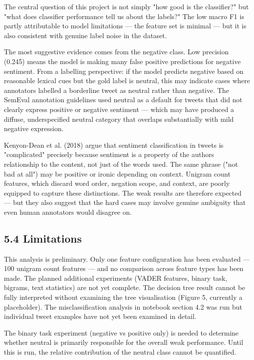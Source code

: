 \documentclass[
  12pt,
]{article}
\begin{document}
The central question of this project is not simply "how good is the
classifier?" but "what does classifier performance tell us about the
labels?" The low macro F1 is partly attributable to model limitations
--- the feature set is minimal --- but it is also consistent with
genuine label noise in the dataset.

The most suggestive evidence comes from the negative class. Low
precision (0.245) means the model is making many false positive
predictions for negative sentiment. From a labelling perspective: if the
model predicts negative based on reasonable lexical cues but the gold
label is neutral, this may indicate cases where annotators labelled a
borderline tweet as neutral rather than negative. The SemEval annotation
guidelines used neutral as a default for tweets that did not clearly
express positive or negative sentiment --- which may have produced a
diffuse, underspecified neutral category that overlaps substantially
with mild negative expression.

Kenyon-Dean et al. (2018) argue that sentiment classification in tweets
is "complicated" precisely because sentiment is a property of the
author\textquotesingle s relationship to the content, not just of the
words used. The same phrase ("not bad at all") may be positive or ironic
depending on context. Unigram count features, which discard word order,
negation scope, and context, are poorly equipped to capture these
distinctions. The weak results are therefore expected --- but they also
suggest that the hard cases may involve genuine ambiguity that even
human annotators would disagree on.

\subsection{5.4 Limitations}\label{limitations}

This analysis is preliminary. Only one feature configuration has been
evaluated --- 100 unigram count features --- and no comparison across
feature types has been made. The planned additional experiments (VADER
features, binary task, bigrams, text statistics) are not yet complete.
The decision tree result cannot be fully interpreted without examining
the tree visualisation (Figure 5, currently a placeholder). The
misclassification analysis in notebook section 4.2 was run but
individual tweet examples have not yet been examined in detail.

The binary task experiment (negative vs positive only) is needed to
determine whether neutral is primarily responsible for the overall weak
performance. Until this is run, the relative contribution of the neutral
class cannot be quantified.
\end{document}
